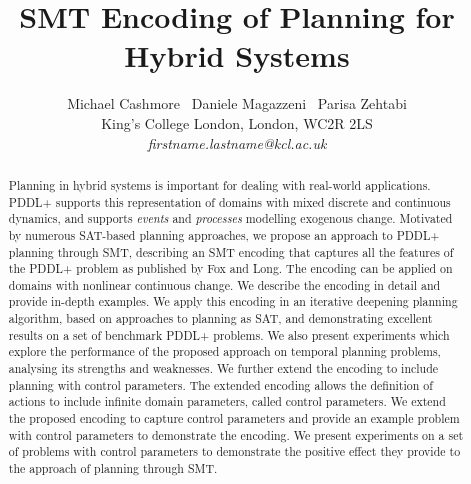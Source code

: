 \documentclass[letterpaper]{article}
\begin{document}
\title{SMT Encoding of Planning for Hybrid Systems}
\author{\center
 Michael Cashmore \, Daniele Magazzeni \, Parisa Zehtabi \\
King’s College London, London, WC2R 2LS \\
\textit{firstname.lastname@kcl.ac.uk} \\
}
\maketitle


\begin{abstract}
Planning in hybrid systems is important for dealing with real-world applications. PDDL+ supports this representation of domains with mixed discrete and continuous dynamics, and supports \textit{events} and \textit{processes} modelling exogenous change.
%
Motivated by numerous SAT-based planning approaches, we propose an approach to PDDL+ planning through SMT, describing an SMT encoding that captures all the features of the PDDL+ problem as published by Fox and Long. The encoding can be applied on domains with nonlinear continuous change. We describe the encoding in detail and provide in-depth examples.
%
We apply this encoding in an iterative deepening planning algorithm, based on approaches to planning as SAT, and demonstrating excellent results on a set of benchmark PDDL+ problems. We also present experiments which explore the performance of the proposed approach on temporal planning problems, analysing its strengths and weaknesses.
%
We further extend the encoding to include planning with control parameters. The extended encoding allows the definition of actions to include infinite domain parameters, called control parameters. We extend the proposed encoding to capture control parameters and provide an example problem with control parameters to demonstrate the encoding. We present experiments on a set of problems with control parameters to demonstrate the positive effect they provide to the approach of planning through SMT.
\end{abstract}













\end{document}
